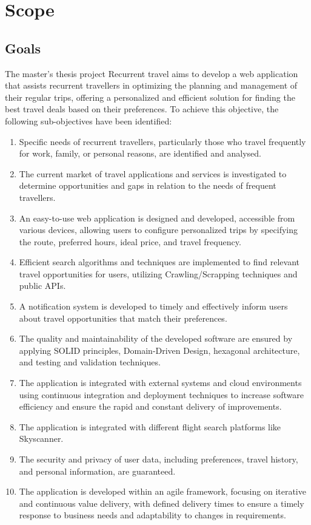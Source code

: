 \documentclass[../memory.tex]{subfiles}
\begin{document}
\section{Scope}
\subsection{Goals}
The master's thesis project Recurrent travel aims to develop a web application
that assists recurrent travellers in optimizing the planning and management of
their regular trips, offering a personalized and efficient solution for finding
the best travel deals based on their preferences. To achieve this objective, the
following sub-objectives have been identified:
\begin{enumerate}[label = -]
	\item Specific needs of recurrent travellers, particularly those who travel
	      frequently for work, family, or personal reasons, are identified and
	      analysed.
	\item The current market of travel applications and services is investigated
	      to determine opportunities and gaps in relation to the needs of frequent
	      travellers.
	\item An easy-to-use web application is designed and developed, accessible
	      from various devices, allowing users to configure personalized trips by
	      specifying the route, preferred hours, ideal price, and travel frequency.
	\item Efficient search algorithms and techniques are implemented to find
	      relevant travel opportunities for users, utilizing Crawling/Scrapping
	      techniques and public APIs.
	\item A notification system is developed to timely and effectively inform
	      users about travel opportunities that match their preferences.
	\item The quality and maintainability of the developed software are ensured
	      by applying SOLID principles, Domain-Driven Design, hexagonal
	      architecture, and testing and validation techniques.
	\item The application is integrated with external systems and cloud
	      environments using continuous integration and deployment techniques to
	      increase software efficiency and ensure the rapid and constant delivery of
	      improvements.
	\item The application is integrated with different flight search platforms
	      like Skyscanner.
	\item The security and privacy of user data, including preferences, travel
	      history, and personal information, are guaranteed.
	\item The application is developed within an agile framework, focusing on
	      iterative and continuous value delivery, with defined delivery times to
	      ensure a timely response to business needs and adaptability to changes in
	      requirements.
\end{enumerate}
\end{document}
